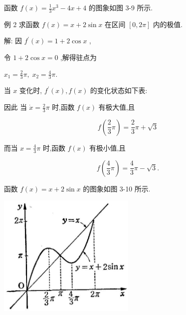 \documentclass[lang=cn,newtx,12pt,scheme=chinese]{elegantbook}
\begin{document}
函数 \(f\left( x\right) = \frac{1}{3}{x}^{3} - {4x} + 4\) 的图象如图 3-9 所示.

例 2 求函数 \(f\left( x\right) = x + 2\sin x\) 在区间 \(\left\lbrack {0,{2\pi }}\right\rbrack\) 内的极值.

解: 因 \({f}^{\prime }\left( x\right) = 1 + 2\cos x\) ,

令 \(1 + 2\cos x = 0\) ,解得驻点为

\({x}_{1} = \frac{2}{3}\pi ,\;{x}_{2} = \frac{4}{3}\pi .\)

当 \(x\) 变化时, \({f}^{\prime }\left( x\right) ,f\left( x\right)\) 的变化状态如下表:

\begin{center}
\end{center}

因此 当 \(\dot{x} = \frac{2}{3}\pi\) 时,函数 \(f\left( x\right)\) 有极大值,且

\[
f\left( {\frac{2}{3}\pi }\right) = \frac{2}{3}\pi + \sqrt{3}
\]

而当 \(x = \frac{4}{3}\pi\) 时,函数 \(f\left( x\right)\) 有极小值,且

\[
f\left( {\frac{4}{3}\pi }\right) = \frac{4}{3}\pi - \sqrt{3}.
\]

函数 \(f\left( x\right) = x + 2\sin x\) 的图象如图 3-10 所示.

\begin{center}
\includegraphics[max width=0.5\textwidth]{images/01912c18-5c3f-733d-b775-749ba9897a9d_144_191268.jpg}
\end{center}
\end{document}
